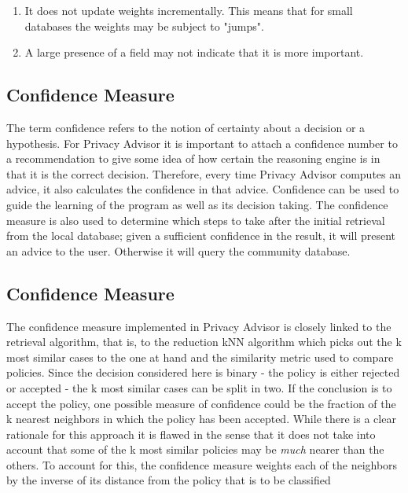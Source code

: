 \begin{enumerate}
\item It does not update weights incrementally. This means that for small databases the weights may be subject to "jumps".
\item A large presence of a field may not indicate that it is more important.
\end{enumerate}


\subsection{Confidence Measure}\label{confidenceMeasure}
The term confidence refers to the notion of certainty about a decision or a hypothesis. For Privacy Advisor it is important to attach a confidence number to a recommendation to give some idea of how certain the reasoning engine is in that it is the correct decision. Therefore, every time Privacy Advisor computes an advice, it also calculates the confidence in that advice. Confidence can be used to guide the learning of the program as well as its decision taking. The confidence measure is also used to determine which steps to take after the initial retrieval from the local database; given a sufficient confidence in the result, it will present an advice to the user. Otherwise it will query the community database.

\subsection{Confidence Measure}\label{confidenceMeasure} %
The confidence measure implemented in Privacy Advisor is closely linked to the retrieval algorithm, that is, to the reduction kNN algorithm which picks out the k most similar cases to the one at hand and the similarity metric used to compare policies. Since the decision considered here is binary - the policy is either rejected or accepted - the k most similar cases can be split in two. If the conclusion is to accept the policy, one possible measure of confidence could be the fraction of the k nearest neighbors in which the policy has been accepted. While there is a clear rationale for this approach it is flawed in the sense that it does not take into account that some of the k most similar policies may be \emph{much} nearer than the others. To account for this, the confidence measure weights each of the neighbors by the inverse of its distance from the policy that is to be classified

